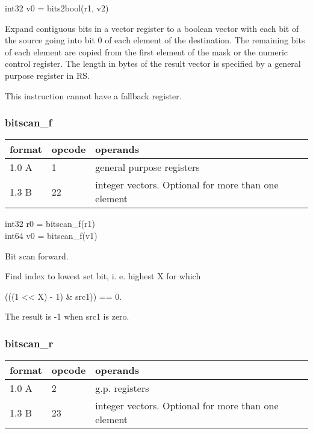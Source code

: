 \documentclass[forwardcom.tex]{subfiles}
\begin{document}
int32 v0 = bits2bool(r1, v2)
\vspace{2mm}

Expand contiguous bits in a vector register to a boolean vector with each bit of the source going into bit 0 of each element of the destination. 
The remaining bits of each element are copied from the first element of the mask or the numeric control register.
The length in bytes of the result vector is specified by a general purpose register in RS.
\vspace{2mm}

This instruction cannot have a fallback register.

\subsubsection{bitscan\_f}
\label{table:bitscanFInstruction}
\begin{tabular}{|p{12mm}|p{12mm}|p{110mm}|}
\hline
\bfseries format & \bfseries opcode & \bfseries operands \\ \hline
1.0 A &  1 & general purpose registers \\ \hline
1.3 B & 22 & integer vectors. Optional for more than one element \\ \hline
\end{tabular}
\vspace{2mm}

int32 r0 = bitscan\_f(r1)\\
int64 v0 = bitscan\_f(v1)
\vspace{2mm}

Bit scan forward. 
\vspace{2mm}

Find index to lowest set bit, i. e. highest X for which 

(((1 \textless\textless{} X) - 1) \& src1)) == 0.
\vspace{2mm}

The result is -1 when src1 is zero.

\subsubsection{bitscan\_r}
\label{table:bitscanRInstruction}
\begin{tabular}{|p{12mm}|p{12mm}|p{110mm}|}
\hline
\bfseries format & \bfseries opcode & \bfseries operands \\ \hline
1.0 A &  2 & g.p. registers \\ \hline
1.3 B & 23 & integer vectors. Optional for more than one element \\ \hline
\end{tabular}
\vspace{2mm}
\end{document}

